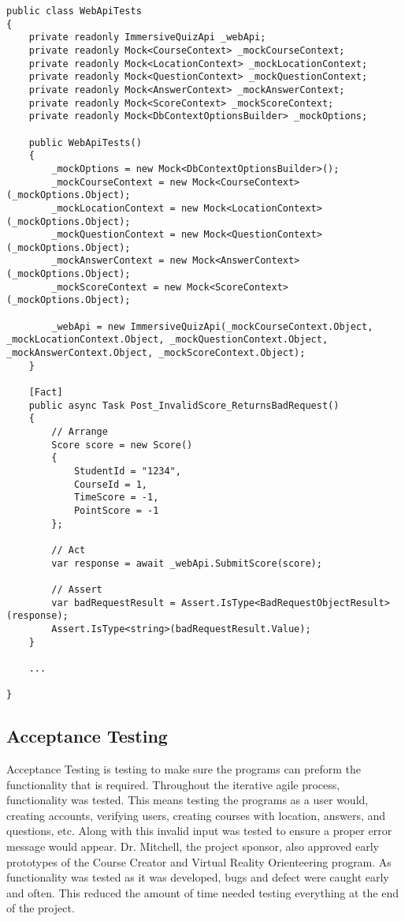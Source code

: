 \begin{lstlisting}[caption=Example Unit Test,label=lst:UnitTest]
public class WebApiTests
{
	private readonly ImmersiveQuizApi _webApi;
	private readonly Mock<CourseContext> _mockCourseContext;
	private readonly Mock<LocationContext> _mockLocationContext;
	private readonly Mock<QuestionContext> _mockQuestionContext;
	private readonly Mock<AnswerContext> _mockAnswerContext;
	private readonly Mock<ScoreContext> _mockScoreContext;
	private readonly Mock<DbContextOptionsBuilder> _mockOptions;
	
	public WebApiTests()
	{
		_mockOptions = new Mock<DbContextOptionsBuilder>();
		_mockCourseContext = new Mock<CourseContext>(_mockOptions.Object);
		_mockLocationContext = new Mock<LocationContext>(_mockOptions.Object);
		_mockQuestionContext = new Mock<QuestionContext>(_mockOptions.Object);
		_mockAnswerContext = new Mock<AnswerContext>(_mockOptions.Object);
		_mockScoreContext = new Mock<ScoreContext>(_mockOptions.Object);
		
		_webApi = new ImmersiveQuizApi(_mockCourseContext.Object, _mockLocationContext.Object, _mockQuestionContext.Object, _mockAnswerContext.Object, _mockScoreContext.Object);
	}
	
	[Fact]
	public async Task Post_InvalidScore_ReturnsBadRequest()
	{
		// Arrange
		Score score = new Score()
		{
			StudentId = "1234",
			CourseId = 1,
			TimeScore = -1,
			PointScore = -1
		};
		
		// Act
		var response = await _webApi.SubmitScore(score);
		
		// Assert
		var badRequestResult = Assert.IsType<BadRequestObjectResult>(response);
		Assert.IsType<string>(badRequestResult.Value);
	} 
	
	...
	
}
\end{lstlisting}

\subsection{Acceptance Testing}
Acceptance Testing is testing to make sure the programs can preform the functionality that is required. Throughout the iterative agile process, functionality was tested. This means testing the programs as a user would, creating accounts, verifying users, creating courses with location, answers, and questions, etc. Along with this invalid input was tested to ensure a proper error message would appear. Dr. Mitchell, the project sponsor, also approved early prototypes of the Course Creator and Virtual Reality Orienteering program.  As functionality was tested as it was developed, bugs and defect were caught early and often. This reduced the amount of time needed testing everything at the end of the project.

